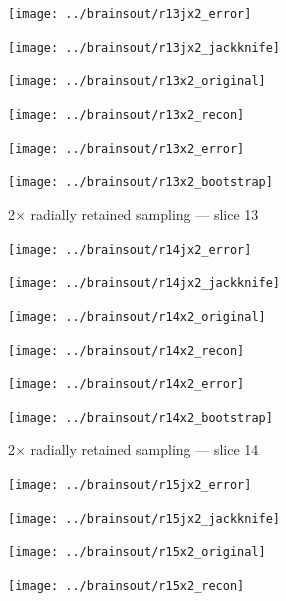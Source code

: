 \documentclass[article]{jdssv}
\begin{document}
\begin{appendix}
\begin{figure}
\begin{centering}
\parbox{\imsize}{\texttt{[image: ../brainsout/r13jx2\_error]}}
\parbox{\imsize}{\texttt{[image: ../brainsout/r13jx2\_jackknife]}}

\vspace{\vertsep}

\parbox{\imsize}{\texttt{[image: ../brainsout/r13x2\_original]}}
\parbox{\imsize}{\texttt{[image: ../brainsout/r13x2\_recon]}}

\vspace{\vertsep}

\parbox{\imsize}{\texttt{[image: ../brainsout/r13x2\_error]}}
\parbox{\imsize}{\texttt{[image: ../brainsout/r13x2\_bootstrap]}}

\end{centering}
\caption{2$\times$ radially retained sampling --- slice 13}
\end{figure}


\begin{figure}
\begin{centering}

\parbox{\imsize}{\texttt{[image: ../brainsout/r14jx2\_error]}}
\parbox{\imsize}{\texttt{[image: ../brainsout/r14jx2\_jackknife]}}

\vspace{\vertsep}

\parbox{\imsize}{\texttt{[image: ../brainsout/r14x2\_original]}}
\parbox{\imsize}{\texttt{[image: ../brainsout/r14x2\_recon]}}

\vspace{\vertsep}

\parbox{\imsize}{\texttt{[image: ../brainsout/r14x2\_error]}}
\parbox{\imsize}{\texttt{[image: ../brainsout/r14x2\_bootstrap]}}

\end{centering}
\caption{2$\times$ radially retained sampling --- slice 14}
\end{figure}


\begin{figure}
\begin{centering}

\parbox{\imsize}{\texttt{[image: ../brainsout/r15jx2\_error]}}
\parbox{\imsize}{\texttt{[image: ../brainsout/r15jx2\_jackknife]}}

\vspace{\vertsep}

\parbox{\imsize}{\texttt{[image: ../brainsout/r15x2\_original]}}
\parbox{\imsize}{\texttt{[image: ../brainsout/r15x2\_recon]}}

\vspace{\vertsep}


\end{centering}
\end{figure}
\end{appendix}
\end{document}
